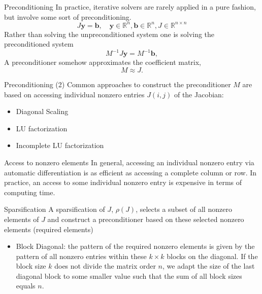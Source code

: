 \documentclass{beamer}
\newcommand{\vek}[1]{{\ensuremath{\mathbf #1}}}
\newcommand{\R}{\ensuremath{\field{R}}}
\newcommand{\field}[1]{\mathbb{#1}}
\newcommand{\sparsifysymbol}{\ensuremath{\rho}}
\newcommand{\sparsify}[1]{\ensuremath{\sparsifysymbol(#1)}}
\begin{document}
\begin{frame}{Preconditioning}
In practice,
iterative solvers are rarely applied in a pure fashion, but involve some sort of
preconditioning.
$$J \vek{y}=\vek{b},\quad \vek{y} \in \R^n, \vek{b} \in \R^n, J \in \R^{n \times n}$$
Rather than solving the unpreconditioned system
 one is solving the preconditioned system
$$M^{-1} J \vek{y}= M^{-1}\vek{b},$$
A preconditioner somehow approximates the coefficient matrix,
$$M \approx J.$$
\end{frame}

\begin{frame}{Preconditioning (2)}
Common approaches to construct the preconditioner $M$ are based on accessing individual
nonzero entries $J(i,j)$ of the Jacobian:

\begin{itemize}
\item Diagonal Scaling 
\item LU factorization 
\item Incomplete LU factorization
\end{itemize}

\begin{alertblock}{Access to nonzero elements}
 In general, accessing an
individual nonzero entry via automatic differentiation is as efficient as accessing a
complete column or row. In practice, an access to some individual nonzero entry is
 expensive in terms of computing time.
\end{alertblock}
\end{frame}

\begin{frame}{Sparsification}
A sparsification of $J$, \sparsify{J}, selects a 
subset of all nonzero elements of $J$ and construct a
preconditioner based on these selected nonzero elements (required elements)
\begin{itemize}
\item Block Diagonal: the pattern of the required nonzero elements is
given by the pattern of all nonzero entries within these $k\times k$ blocks on the
diagonal. If the block size $k$ does not divide the matrix order $n$, we adapt the size
of the last diagonal block to some smaller value such that the sum of all block sizes
equals $n$.
\end{itemize}
\end{frame}
\end{document}
